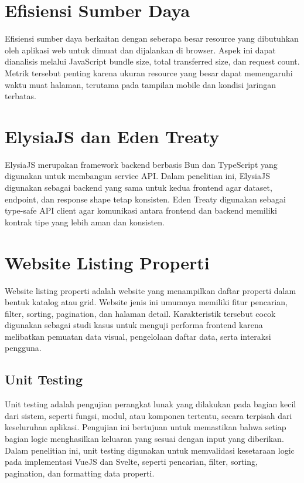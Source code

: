 \documentclass[12pt,a4paper]{report}
\begin{document}
\section{Efisiensi Sumber Daya}
Efisiensi sumber daya berkaitan dengan seberapa besar resource yang dibutuhkan oleh aplikasi web untuk dimuat dan dijalankan di browser. Aspek ini dapat dianalisis melalui JavaScript bundle size, total transferred size, dan request count. Metrik tersebut penting karena ukuran resource yang besar dapat memengaruhi waktu muat halaman, terutama pada tampilan mobile dan kondisi jaringan terbatas.

\section{ElysiaJS dan Eden Treaty}
ElysiaJS merupakan framework backend berbasis Bun dan TypeScript yang digunakan untuk membangun service API. Dalam penelitian ini, ElysiaJS digunakan sebagai backend yang sama untuk kedua frontend agar dataset, endpoint, dan response shape tetap konsisten. Eden Treaty digunakan sebagai type-safe API client agar komunikasi antara frontend dan backend memiliki kontrak tipe yang lebih aman dan konsisten.

\section{Website Listing Properti}
Website listing properti adalah website yang menampilkan daftar properti dalam bentuk katalog atau grid. Website jenis ini umumnya memiliki fitur pencarian, filter, sorting, pagination, dan halaman detail. Karakteristik tersebut cocok digunakan sebagai studi kasus untuk menguji performa frontend karena melibatkan pemuatan data visual, pengelolaan daftar data, serta interaksi pengguna.

\subsection{Unit Testing}
Unit testing adalah pengujian perangkat lunak yang dilakukan pada bagian kecil dari sistem, seperti fungsi, modul, atau komponen tertentu, secara terpisah dari keseluruhan aplikasi. Pengujian ini bertujuan untuk memastikan bahwa setiap bagian logic menghasilkan keluaran yang sesuai dengan input yang diberikan. Dalam penelitian ini, unit testing digunakan untuk memvalidasi kesetaraan logic pada implementasi VueJS dan Svelte, seperti pencarian, filter, sorting, pagination, dan formatting data properti.
\end{document}
